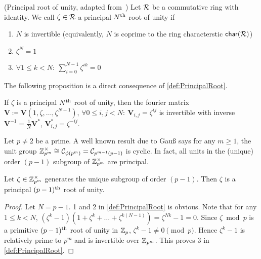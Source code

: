 \begin{definition}{(Principal root of unity, adapted from~\cite{MISC:WikiRoot})} \label{def:PrincipalRoot}
    Let \(\mathcal{R}\) be a commutative ring with identity. We call \(\zeta \in \mathcal{R}\) a principal \(N\textsuperscript{th}\) root of unity if
    \begin{enumerate}
        \item \(N\) is invertible (equivalently, \(N\) is coprime to the ring characterstic \(\mathsf{char}(\mathcal{R})\))
        \item \(\zeta^N = 1\)
        \item \(\forall 1 \le k < N:\: \sum_{i=0}^{N-1}\zeta^{ik} = 0\)
    \end{enumerate}
\end{definition}

The following proposition is a direct consequence of \cref{def:PrincipalRoot}.
\begin{proposition} \label{prop:InvFourierMat}
    If \(\zeta\) is a principal \(N\textsuperscript{th}\) root of unity, then the fourier matrix \(\bm{V} \coloneq \bm{V}(1, \zeta, \ldots, \zeta^{N-1})\), \(\forall 0 \le i,j < N:\:\bm{V}_{i,j} = \zeta^{ij}\) is invertible with inverse \(\bm{V}^{-1} = \frac{1}{N}\bm{V}^{\ast}\), \(\bm{V}^{\ast}_{i,j} = \zeta^{-ij}\).
\end{proposition}

\ifFullVersion
Let \(p \ne 2\) be a prime. A well known result due to Gau{\ss} says for any \(m \ge 1\), the unit group \(\mathbb{Z}_{p^m}^{\times} \cong \mathcal{C}_{\phi(p^m)} = \mathcal{C}_{p^{m-1}(p-1)}\) is cyclic. In fact, all units in the (unique) order \((p-1)\) subgroup of \(\mathbb{Z}_{p^m}^{\times}\) are principal.
\begin{proposition} \label{prop:SubgrpPrincipal}
    Let \(\zeta \in \mathbb{Z}_{p^m}^{\times}\) generates the unique subgroup of order \((p - 1)\). Then \(\zeta\) is a principal \((p-1)\textsuperscript{th}\) root of unity.
\end{proposition}
\begin{proof}
    Let \(N = p - 1\). 1 and 2 in \cref{def:PrincipalRoot} is obvious. Note that for any \(1 \le k < N\), \((\zeta^k - 1)(1 + \zeta^k + \ldots + \zeta^{k(N-1)}) = \zeta^{Nk} - 1 = 0\). Since \(\zeta \bmod p\) is a primitive \((p-1)\textsuperscript{th}\) root of unity in \(\mathbb{Z}_p\), \(\zeta^k - 1 \ne 0 \pmod{p}\). Hence \(\zeta^k - 1\) is relatively prime to \(p^m\) and is invertible over \(\mathbb{Z}_{p^m}\). This proves 3 in \cref{def:PrincipalRoot}.
\end{proof}
\fi

